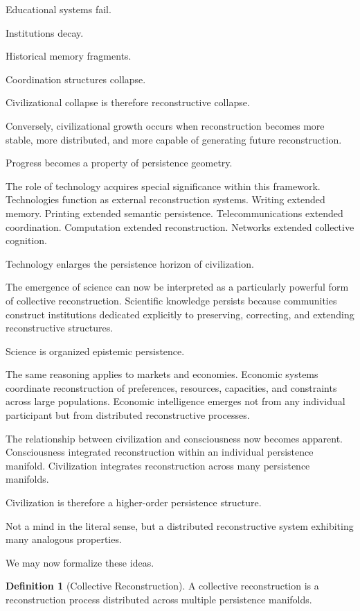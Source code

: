 \documentclass[12pt,oneside]{article}
\theoremstyle{definition}
\newtheorem{definition}[theorem]{Definition} \newtheorem{axiom}[theorem]{Axiom} \newtheorem{remark}[theorem]{Remark} \newtheorem{example}[theorem]{Example}
\begin{document}
Educational systems fail.

Institutions decay.

Historical memory fragments.

Coordination structures collapse.

Civilizational collapse is therefore reconstructive collapse.

Conversely, civilizational growth occurs when reconstruction becomes more stable, more distributed, and more capable of generating future reconstruction.

Progress becomes a property of persistence geometry.

The role of technology acquires special significance within this framework. Technologies function as external reconstruction systems. Writing extended memory. Printing extended semantic persistence. Telecommunications extended coordination. Computation extended reconstruction. Networks extended collective cognition.

Technology enlarges the persistence horizon of civilization.

The emergence of science can now be interpreted as a particularly powerful form of collective reconstruction. Scientific knowledge persists because communities construct institutions dedicated explicitly to preserving, correcting, and extending reconstructive structures.

Science is organized epistemic persistence.

The same reasoning applies to markets and economies. Economic systems coordinate reconstruction of preferences, resources, capacities, and constraints across large populations. Economic intelligence emerges not from any individual participant but from distributed reconstructive processes.

The relationship between civilization and consciousness now becomes apparent. Consciousness integrated reconstruction within an individual persistence manifold. Civilization integrates reconstruction across many persistence manifolds.

Civilization is therefore a higher-order persistence structure.

Not a mind in the literal sense, but a distributed reconstructive system exhibiting many analogous properties.

We may now formalize these ideas.

\begin{definition}[Collective Reconstruction]

A collective reconstruction is a reconstruction process distributed across multiple persistence manifolds.

\end{definition}
\end{document}
